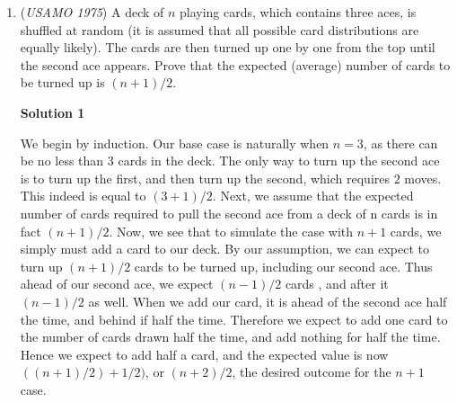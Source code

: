 \begin{enumerate}
 Let $E$ and $F$ be the centers of the small and big circles, respectively, and $r$ and $R$ be their respective radii.

 Let $M$ and $N$ be the feet of $E$ and $F$ to $AB$, and $\alpha = \angle APE$ and $\epsilon = \angle BPF$

 We have:

 
 \[AP \times PB = 2r \cos{\alpha} \times 2R \cos{\epsilon} = 4 rR \cos{\alpha} \cos{\epsilon}\]
$AP\times PB$ is maximum when the product $\cos{\alpha} \cos{\epsilon}$ is a maximum.

 We have $\cos{\alpha} \cos{\epsilon}= \frac{1}{2} [\cos(\alpha +\epsilon) + \cos(\alpha -\epsilon)]$

 But $\alpha +\epsilon = 180^{\circ} - \angle EPF$ and is fixed, so is $\cos(\alpha +\epsilon)$.

 So its maximum depends on $cos(\alpha -\epsilon)$ which occurs when $\alpha=\epsilon$. To draw the line $AB$:

 Draw a circle with center $P$ and radius $PE$ to cut the radius $PF$ at $H$. Draw the line parallel to $EH$ passing through $P$. This line meets the small and big circles at $A$ and $B$, respectively.

 


 
<i>Alternate solutions are always welcome. If you have a different, elegant solution to this problem, please \href{https://artofproblemsolving.com/wiki/index.php?title=1975\_USAMO\_Problems/Problem\_4&action=edit}{add it} to this page.</i>



	\item (\textit{USAMO 1975}) A deck of $n$ playing cards, which contains three aces, is shuffled at random (it is assumed that all possible card distributions are equally likely). The cards are then turned up one by one from the top until the second ace appears. Prove that the expected (average) number of cards to be turned up is $(n+1)/2$.


 



\textbf{Solution 1}

We begin by induction. Our base case is naturally when $n = 3$, as there can be no less than $3$ cards in the deck. The only way to turn up the second ace is to turn up the first, and then turn up the second, which requires $2$ moves. This indeed is equal to $(3 + 1)/2$. Next, we assume that the expected number of cards required to pull the second ace from a deck of n cards is in fact $(n + 1)/2$. Now, we see that to simulate the case with $n + 1$ cards, we simply must add a card to our deck. By our assumption, we can expect to turn up $(n + 1)/2$ cards to be turned up, including our second ace. Thus ahead of our second ace, we expect $(n - 1)/2$ cards , and after it $(n - 1)/2$ as well. When we add our card, it is ahead of the second ace half the time, and behind if half the time. Therefore we expect to add one card to the number of cards drawn half the time, and add nothing for half the time. Hence we expect to add half a card, and the expected value is now $((n + 1)/2) + 1/2)$, or $(n + 2)/2$, the desired outcome for the $n + 1$ case.


\end{enumerate}
